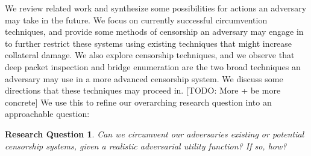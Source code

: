 \documentclass[12pt]{report}
\newtheorem{question}{Research Question}
\begin{document}
We review related work and synthesize some possibilities for actions an adversary may take in the future. We focus on currently successful circumvention techniques, and provide some methods of censorship an adversary may engage in to further restrict these systems using existing techniques that might increase collateral damage. We also explore censorship techniques, and we observe that deep packet inspection and bridge enumeration are the two broad techniques an adversary may use in a more advanced censorship system. We discuss some directions that these techniques may proceed in. [TODO: More + be more concrete] We use this to refine our overarching research question into an approachable question:

\begin{question}
Can we circumvent our adversaries existing or potential censorship systems, given a realistic adversarial utility function? If so, how?
\end{question}
\end{document}
